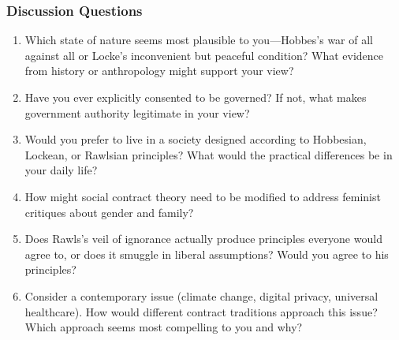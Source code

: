 \documentclass[aspectratio=169]{beamer}
\begin{document}
\begin{frame}
  \frametitle{Discussion Questions}
  
  \begin{enumerate}
    \item Which state of nature seems most plausible to you—Hobbes's war of all against all or Locke's inconvenient but peaceful condition? What evidence from history or anthropology might support your view?
    
    \item Have you ever explicitly consented to be governed? If not, what makes government authority legitimate in your view?
    
    \item Would you prefer to live in a society designed according to Hobbesian, Lockean, or Rawlsian principles? What would the practical differences be in your daily life?
    
    \item How might social contract theory need to be modified to address feminist critiques about gender and family?
    
    \item Does Rawls's veil of ignorance actually produce principles everyone would agree to, or does it smuggle in liberal assumptions? Would you agree to his principles?
    
    \item Consider a contemporary issue (climate change, digital privacy, universal healthcare). How would different contract traditions approach this issue? Which approach seems most compelling to you and why?
  \end{enumerate}
\end{frame}
\end{document}
